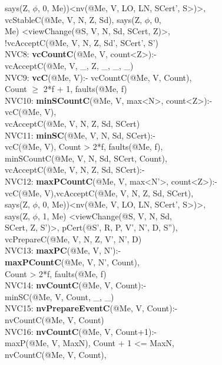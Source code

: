 \begin{code}
\> says(Z, $\phi$, 0, Me))<nv(@Me, V, LO, LN, SCert', S>)>,\\
\> vcStableC(@Me, V, N, Z, Sd), says(Z, $\phi$, 0, \\
\> Me) <viewChange(@S, V, N, Sd, SCert, Z)>,\\
\> !vcAcceptC(@Me, V, N, Z, Sd', SCert', S')\\
NVC8: \textbf{vcCountC}(@Me, V, count<Z>):-\\
\> vcAcceptC(@Me, V, \_, Z, \_, \_, \_)\\
NVC9: \textbf{vcC}(@Me, V):- vcCountC(@Me, V, Count),\\
\> Count $\geq$ 2*f + 1, faults(@Me, f)\\
NVC10: \textbf{minSCountC}(@Me, V, max<N>, count<Z>):- \\
\> vcC(@Me, V),\\
\> vcAcceptC(@Me, V, N, Z, Sd, SCert)\\
NVC11: \textbf{minSC}(@Me, V, N, Sd, SCert):- \\
\> vcC(@Me, V), Count > 2*f, faults(@Me, f),\\
\> minSCountC(@Me, V, N, Sd, SCert, Count), \\
\> vcAcceptC(@Me, V, N, Z, Sd, SCert):-\\
NVC12: \textbf{maxPCountC}(@Me, V, max<N'>, count<Z>):- \\
\> vcC(@Me, V),vcAcceptC(@Me, V, N, Z, Sd, SCert),\\
\> says(Z, $\phi$, 0, Me))<nv(@Me, V, LO, LN, SCert', S>)>,\\
\> says(Z, $\phi$, 1, Me) <viewChange(@S, V, N, Sd, \\
\> SCert, Z, S')>, pCert(@S', R, P, V', N', D, S''),\\
\> vcPrepareC(@Me, V, N, Z, V', N', D)\\
NVC13: \textbf{maxPC}(@Me, V, N'):- \\
\> \textbf{maxPCountC}(@Me, V, N', Count),\\
\> Count > 2*f, faults(@Me, f)\\
NVC14: \textbf{nvCountC}(@Me, V, Count):-\\
\> minSC(@Me, V, Count, \_, \_)\\
NVC15: \textbf{nvPrepareEventC}(@Me, V, Count):-\\
\> nvCountC(@Me, V, Count)\\
NVC16: \textbf{nvCountC}(@Me, V, Count+1):-\\
\> maxP(@Me, V, MaxN), Count + 1 <= MaxN, \\
\> nvCountC(@Me, V, Count), \\

\end{code}
